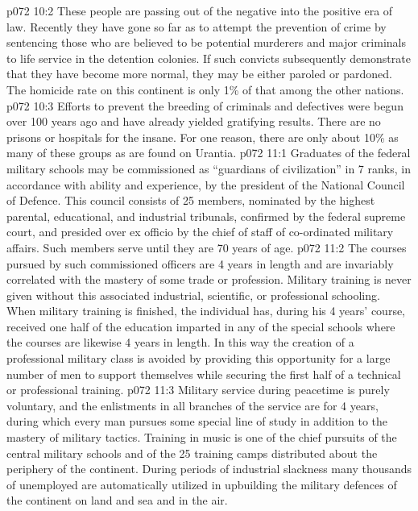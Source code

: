 \vs p072 10:2 These people are passing out of the negative into the positive era of law. Recently they have gone so far as to attempt the prevention of crime by sentencing those who are believed to be potential murderers and major criminals to life service in the detention colonies. If such convicts subsequently demonstrate that they have become more normal, they may be either paroled or pardoned. The homicide rate on this continent is only 1\% of that among the other nations.
\vs p072 10:3 Efforts to prevent the breeding of criminals and defectives were begun over 100 years ago and have already yielded gratifying results. There are no prisons or hospitals for the insane. For one reason, there are only about 10\% as many of these groups as are found on Urantia.
\vs p072 11:1 Graduates of the federal military schools may be commissioned as “guardians of civilization” in 7 ranks, in accordance with ability and experience, by the president of the National Council of Defence. This council consists of 25 members, nominated by the highest parental, educational, and industrial tribunals, confirmed by the federal supreme court, and presided over ex officio by the chief of staff of co\hyp{}ordinated military affairs. Such members serve until they are 70 years of age.
\vs p072 11:2 The courses pursued by such commissioned officers are 4 years in length and are invariably correlated with the mastery of some trade or profession. Military training is never given without this associated industrial, scientific, or professional schooling. When military training is finished, the individual has, during his 4 years’ course, received one half of the education imparted in any of the special schools where the courses are likewise 4 years in length. In this way the creation of a professional military class is avoided by providing this opportunity for a large number of men to support themselves while securing the first half of a technical or professional training.
\vs p072 11:3 Military service during peacetime is purely voluntary, and the enlistments in all branches of the service are for 4 years, during which every man pursues some special line of study in addition to the mastery of military tactics. Training in music is one of the chief pursuits of the central military schools and of the 25 training camps distributed about the periphery of the continent. During periods of industrial slackness many thousands of unemployed are automatically utilized in upbuilding the military defences of the continent on land and sea and in the air.

